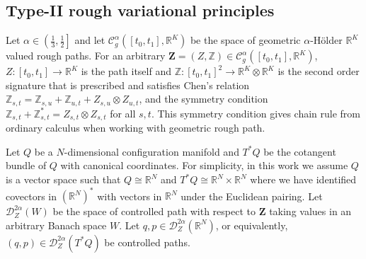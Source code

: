 \documentclass[11pt, oneside]{article}
\numberwithin{equation}{section}
\theoremstyle{definition}
\newcommand{\mc}[1]{\mathcal{#1}}
\newcommand{\mcal}[1]{\mc{#1}}
\begin{document}
\subsection{Type-II rough variational principles}\label{subsec:rough VP}
Let $\alpha \in \left(\frac{1}{3}, \frac{1}{2}\right]$ and let $\mcal{C}^\alpha_g([t_0, t_1], \mathbb{R}^K)$ be the space of geometric $\alpha$-H\"older $\mathbb{R}^K$ valued rough paths. For an arbitrary $\mathbf{Z} = (Z,\mathbb{Z}) \in \mcal{C}^\alpha_g([t_0, t_1],\mathbb{R}^K)$, $Z: [t_0,t_1] \rightarrow \mathbb{R}^K$ is the path itself and $\mathbb{Z}: [t_0,t_1]^2 \rightarrow \mathbb{R}^K\otimes \mathbb{R}^K$ is the second order signature that is prescribed and satisfies Chen's relation $\mathbb{Z}_{s,t} = \mathbb{Z}_{s,u} + \mathbb{Z}_{u,t} + Z_{s,u}\otimes Z_{u,t}$, and the symmetry condition $\mathbb{Z}_{s,t} + \mathbb{Z}_{s,t}^* = Z_{s,t}\otimes Z_{s,t}$ for all $s,t$. This symmetry condition gives chain rule from ordinary calculus when working with geometric rough path. 

Let $Q$ be a $N$-dimensional configuration manifold and $T^*Q$ be the cotangent bundle of $Q$ with canonical coordinates. For simplicity, in this work we assume $Q$ is a vector space such that $Q \cong \mathbb{R}^N$ and $T^*Q \cong \mathbb{R}^N \times \mathbb{R}^N$ where we have identified covectors in $\left(\mathbb{R}^N\right)^*$ with vectors in $\mathbb{R}^N$ under the Euclidean pairing. Let $\mcal{D}^{2\alpha}_Z(W)$ be the space of controlled path with respect to $\mathbf{Z}$ taking values in an arbitrary Banach space $W$. Let $q, p \in \mcal{D}^{2\alpha}_Z(\mathbb{R}^N)$, or equivalently, $(q,p)\in \mcal{D}^{2\alpha}_Z(T^*Q)$ be controlled paths. 
\end{document}
